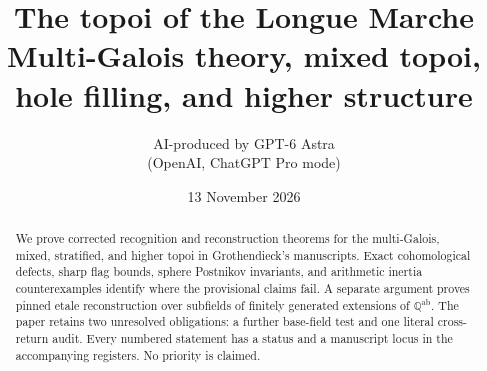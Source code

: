 \documentclass[11pt,a4paper]{article}
\title{The topoi of the Longue Marche\\Multi-Galois theory, mixed topoi, hole filling, and higher structure}
\author{AI-produced by GPT-6 Astra\\(OpenAI, ChatGPT Pro mode)}
\date{13 November 2026}
\theoremstyle{definition}
\begin{document}
\maketitle
\begin{abstract}
We prove corrected recognition and reconstruction theorems for the
multi-Galois, mixed, stratified, and higher topoi in Grothendieck's
manuscripts. Exact cohomological defects, sharp flag bounds, sphere
Postnikov invariants, and arithmetic inertia counterexamples identify
where the provisional claims fail. A separate argument proves pinned
etale reconstruction over subfields of finitely generated extensions
of $\mathbb Q^{\mathrm{ab}}$. The paper retains
two unresolved obligations: a further base-field test and one literal
cross-return audit. Every numbered statement has a status and a
manuscript locus in the accompanying registers. No priority is claimed.
\end{abstract}

\clearpage
\tableofcontents

\nocite{*}


\end{document}
